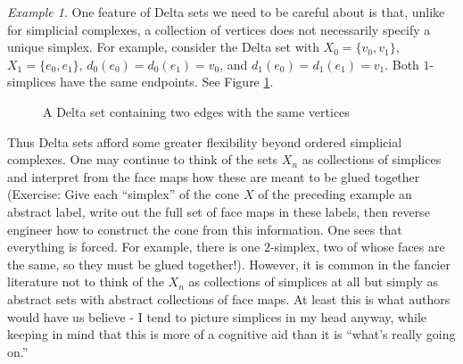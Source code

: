 \documentclass[12pt]{article}
\theoremstyle{plain}
\theoremstyle{definition}
\theoremstyle{remark}
\newtheorem{example}[theorem]{Example}
\begin{document}
\begin{example}\label{E: nonuniqueness}
One feature of Delta sets we need to be careful about is that, unlike for simplicial complexes, a collection of vertices does not necessarily specify a unique simplex. For example, consider the Delta set with $X_0=\{v_0,v_1\}$, $X_1=\{e_0,e_1\}$, $d_0(e_0)=d_0(e_1)=v_0$, and $d_1(e_0)=d_1(e_1)=v_1$. Both $1$-simplices have the same endpoints. See Figure \ref{F: fig15}.
\begin{figure}[!htp]
\begin{center}
\end{center}
\caption{A Delta set containing two edges with the same vertices}\label{F: fig15}
\end{figure}
\end{example}



Thus Delta sets afford some greater flexibility beyond ordered simplicial complexes. One may continue to think of the sets $X_n$ as collections of simplices and interpret from the face maps how these are meant to be glued together (Exercise: Give each ``simplex'' of the cone $X$ of the preceding example an abstract label, write out the full set of face maps in these labels, then reverse engineer how to construct the cone from this information. One sees that everything is forced. For example, there is one $2$-simplex, two of whose faces are the same, so they must be glued together!). However, it is common in the fancier literature not to think of the $X_n$ as collections of simplices at all but simply as abstract sets with abstract collections of face maps. At least this is what authors would have us believe - I tend to picture simplices in my head anyway, while keeping in mind that this is more of a cognitive aid than it is ``what's really going on.''
\end{document}
